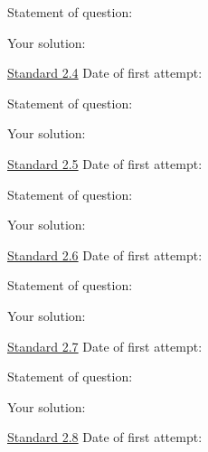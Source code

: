 \documentclass[12pt]{article}
\begin{document}
\bigskip

Statement of question:

\vspace{1in}

Your solution:

\newpage


\underline{Standard 2.4} \hspace{6cm} Date of first attempt:



\bigskip

Statement of question:

\vspace{1in}

Your solution:

\newpage


\underline{Standard 2.5} \hspace{6cm} Date of first attempt:



\bigskip

Statement of question:

\vspace{1in}

Your solution:

\newpage


\underline{Standard 2.6} \hspace{6cm} Date of first attempt:



\bigskip

Statement of question:

\vspace{1in}

Your solution:

\newpage


\underline{Standard 2.7} \hspace{6cm} Date of first attempt:



\bigskip

Statement of question:

\vspace{1in}

Your solution:

\newpage


\underline{Standard 2.8} \hspace{6cm} Date of first attempt:
\end{document}
